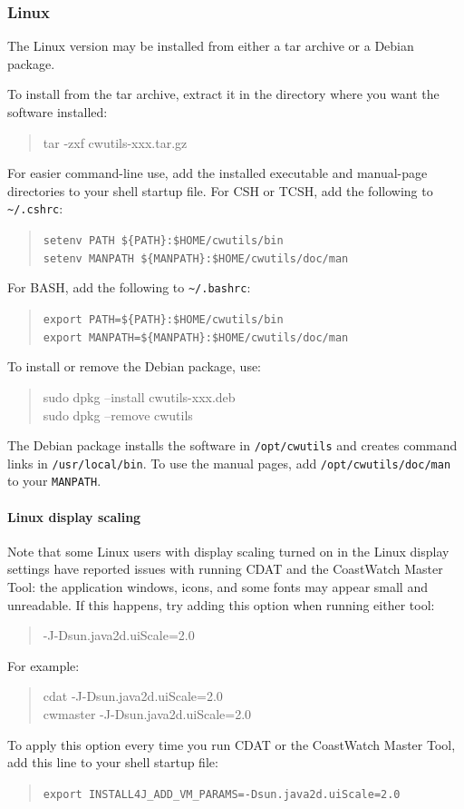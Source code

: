 \subsubsection{Linux}

The Linux version may be installed from either a tar archive or a Debian
package.

To install from the tar archive, extract it in the directory where you want
the software installed:
\begin{quote}
  {\file tar -zxf cwutils-xxx.tar.gz}
\end{quote}

For easier command-line use, add the installed executable and manual-page
directories to your shell startup file.  For CSH or TCSH, add the following
to {\tt \~{ }/.cshrc}:
\begin{quote}
  {\tt setenv PATH \$\{PATH\}:\$HOME/cwutils/bin} \\
  {\tt setenv MANPATH \$\{MANPATH\}:\$HOME/cwutils/doc/man}
\end{quote}
For BASH, add the following to {\tt \~{ }/.bashrc}:
\begin{quote}
  {\tt export PATH=\$\{PATH\}:\$HOME/cwutils/bin} \\
  {\tt export MANPATH=\$\{MANPATH\}:\$HOME/cwutils/doc/man}
\end{quote}

To install or remove the Debian package, use:
\begin{quote}
  {\file sudo dpkg --install cwutils-xxx.deb} \\
  {\file sudo dpkg --remove cwutils}
\end{quote}
The Debian package installs the software in {\tt /opt/cwutils} and creates
command links in {\tt /usr/local/bin}.  To use the manual pages, add
{\tt /opt/cwutils/doc/man} to your {\tt MANPATH}.

\paragraph{Linux display scaling}

Note that some Linux users with display scaling turned on in the Linux display
settings have reported issues with running CDAT and the CoastWatch Master Tool:
the application windows, icons, and some fonts may appear small and unreadable.
If this happens, try adding this option when running either tool:
\begin{quote}
  {\file -J-Dsun.java2d.uiScale=2.0}
\end{quote}
For example:
\begin{quote}
  {\file cdat -J-Dsun.java2d.uiScale=2.0} \\
  {\file cwmaster -J-Dsun.java2d.uiScale=2.0}
\end{quote}
To apply this option every time you run CDAT or the CoastWatch Master Tool,
add this line to your shell startup file:
\begin{quote}
  {\tt export INSTALL4J\_ADD\_VM\_PARAMS=-Dsun.java2d.uiScale=2.0}
\end{quote}

